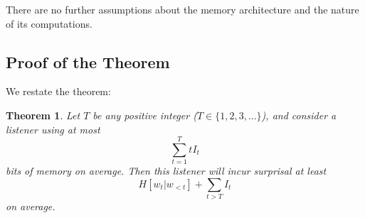 \documentclass[11pt,letterpaper]{article}
\newcounter{theorem}
\newtheorem{thm}[theorem]{Theorem}
\begin{document}
There are no further assumptions about the memory architecture and the nature of its computations.



\subsection{Proof of the Theorem}\label{sec:proof}

We restate the theorem:

\begin{thm}\label{prop:suboptimal}
	Let $T$ be any positive integer ($T \in \{1, 2, 3, ...\}$), and consider a listener using at most
	\begin{equation}\label{eq:memory}
		\sum_{t=1}^T t I_t
	\end{equation}
bits of memory on average.
Then this listener will incur surprisal at least
	$$H[w_t|w_{<t}] + \sum_{t > T} I_t$$
	on average.
\end{thm}



\end{document}
